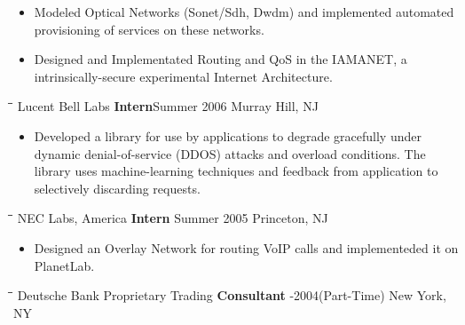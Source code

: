 \begin{resume}
\begin{itemize}
   \item Modeled Optical Networks (Sonet/Sdh, Dwdm) and implemented automated 
   provisioning of services on these networks. \\
   \vspace{-15pt}

   \item Designed and Implementated Routing and QoS in the IAMANET, a
   intrinsically-secure experimental Internet Architecture. 
   \vspace{-15pt}
   \end{itemize}
%
   \begin{tabbing} \hspace{1.4in}\= \hspace{2.3in}\= \hspace{1.6in}\= \kill 
    Lucent Bell Labs \> {\bf Intern}\>Summer 2006  \>Murray Hill, NJ
   \end{tabbing}
   \vspace{-10pt}
   \begin{itemize}
   \item Developed a library for use by applications to degrade
   gracefully under dynamic denial-of-service (DDOS) attacks and
   overload conditions. The library uses machine-learning techniques
   and feedback from application to selectively discarding requests.
   \end{itemize}
   \vspace{-15pt}
   \begin{tabbing} \hspace{1.4in}\= \hspace{2.3in}\= \hspace{1.6in}\= \kill 
    NEC Labs, America \> {\bf Intern} \>Summer 2005  \>Princeton, NJ
   \end{tabbing}
   \vspace{-10pt}
   \begin{itemize}
   \item Designed an Overlay Network for routing VoIP calls and
   implementeded it on PlanetLab.
   \end{itemize}
   \vspace{-15pt}
%
   \begin{tabbing} \hspace{2.3in}\= \hspace{1.4in}\= \hspace{1.6in}\= \kill 
     Deutsche Bank Proprietary Trading \> {\bf Consultant} -2004(Part-Time) \>New York, NY
   \end{tabbing}

\end{resume}
